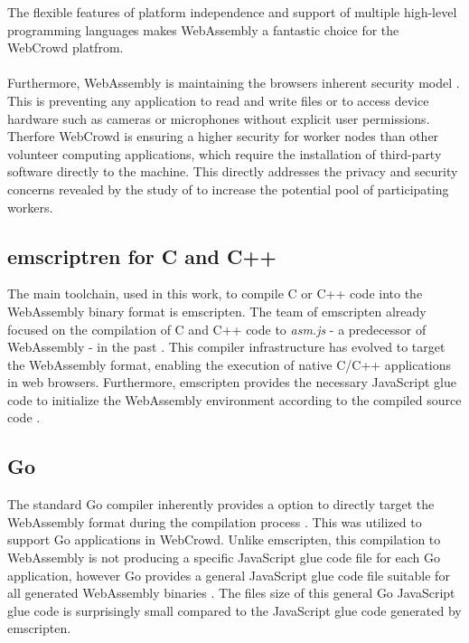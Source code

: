 The flexible features of platform independence and support of multiple high-level programming languages makes WebAssembly a fantastic choice for the WebCrowd platfrom.
\\~\\
Furthermore, WebAssembly is maintaining the browsers inherent security model \cite{methodology:wasm2, methodology:wasmdocu}. This is preventing any application to read and write ﬁles or to access device hardware such as cameras or microphones without explicit user permissions. Therfore WebCrowd is ensuring a higher security for worker nodes than other volunteer computing applications, which require the installation of third-party software directly to the machine. This directly addresses the privacy and security concerns revealed by the study of \citeauthor{intro:volunteerStudy} \cite{intro:volunteerStudy} to increase the potential pool of participating workers.

\subsection{emscriptren for C and C++}
\label{subsec:methodology:wasm:cpp}
The main toolchain, used in this work, to compile C or C++ code into the WebAssembly binary format is emscripten. The team of emscripten already focused on the compilation of C and C++ code to \emph{asm.js} - a predecessor of WebAssembly - in the past \cite{methodology:emcc}. This compiler infrastructure has evolved to target the WebAssembly format, enabling the execution of native C/C++ applications in web browsers. Furthermore, emscripten provides the necessary JavaScript glue code to initialize the WebAssembly environment according to the compiled source code \cite{methodology:emcc}.

\subsection{Go}
\label{subsec:methodology:wasm:go}
The standard Go compiler inherently provides a option to directly target the WebAssembly format during the compilation process \cite{methodology:go}. This was utilized to support Go applications in WebCrowd. Unlike emscripten, this compilation to WebAssembly is not producing a specific JavaScript glue code file for each Go application, however Go provides a general JavaScript glue code file suitable for all generated WebAssembly binaries \cite{methodology:go}. The files size of this general Go JavaScript glue code is surprisingly small compared to the JavaScript glue code generated by emscripten.

